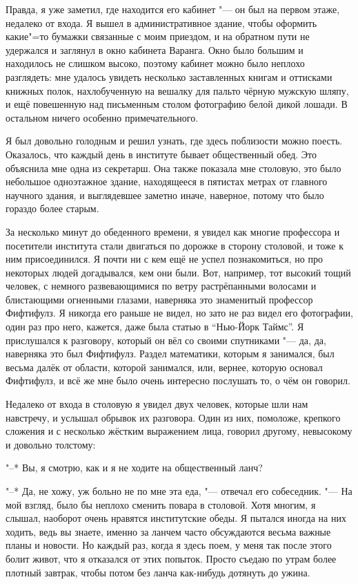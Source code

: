 Правда, я уже заметил, где находится его кабинет "--- он был на первом этаже,
недалеко от входа.
Я вышел в административное здание, чтобы оформить какие"=то бумажки связанные с
моим приездом, и на обратном пути не удержался и заглянул в окно кабинета
Варанга.
Окно было большим и находилось не слишком высоко, поэтому кабинет можно было
неплохо разглядеть:
мне удалось увидеть несколько заставленных книгам и оттисками книжных полок,
нахлобученную на вешалку для пальто чёрную мужскую шляпу, и ещё повешенную над
письменным столом фотографию белой дикой лошади.
В остальном ничего особенно примечательного.

Я был довольно голодным и решил узнать, где здесь поблизости можно поесть.
Оказалось, что каждый день в институте бывает общественный обед.
Это объяснила мне одна из секретарш.
Она также показала мне столовую, это было небольшое одноэтажное здание,
находящееся в пятистах метрах от главного научного здания, и выглядевшее
заметно иначе, наверное, потому что было гораздо более старым.

За несколько минут до обеденного времени, я увидел как многие профессора и
посетители института стали двигаться по дорожке в сторону столовой, и тоже к ним
присоединился.
Я почти ни с кем ещё не успел познакомиться, но про некоторых людей догадывался,
кем они были.
Вот, например, тот высокий тощий человек, с немного развевающимися по ветру
растрёпанными волосами и блистающими огненными глазами, наверняка это знаменитый
профессор Фифтифулз.
Я никогда его раньше не видел, но зато не раз видел его фотографии, один раз про
него, кажется, даже была статью в \enquote{Нью-Йорк Таймс}.
Я прислушался к разговору, который он вёл со своими спутниками "--- да, да,
наверняка это был Фифтифулз.
Раздел математики, которым я занимался, был весьма далёк от области, которой
занимался, или, вернее, которую основал Фифтифулз, и всё же мне было очень
интересно послушать то, о чём он говорил.

Недалеко от входа в столовую я увидел двух человек, которые шли нам навстречу,
и услышал обрывок их разговора.
Один из них, помоложе, крепкого сложения и с несколько жёстким выражением лица,
говорил другому, невысокому и довольно толстому:

"--* Вы, я смотрю, как и я не ходите на общественный ланч?

"--* Да, не хожу, уж больно не по мне эта еда, "--- отвечал его собеседник.
"--- На мой взгляд, было бы неплохо сменить повара в столовой.
Хотя многим, я слышал, наоборот очень нравятся институтские обеды.
Я пытался иногда на них ходить, ведь вы знаете, именно за ланчем часто
обсуждаются весьма важные планы и новости.
Но каждый раз, когда я здесь поем, у меня так после этого болит живот, что я
отказался от этих попыток.
Просто съедаю по утрам более плотный завтрак, чтобы потом без ланча как-нибудь
дотянуть до ужина.

